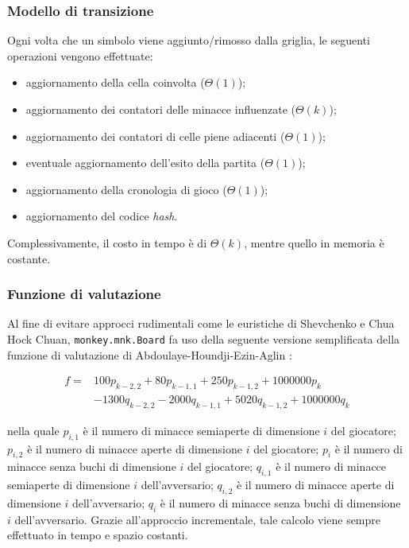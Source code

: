 \documentclass{article}
\begin{document}
\subsubsection{Modello di transizione}

Ogni volta che un simbolo viene aggiunto/rimosso dalla griglia, le seguenti
operazioni vengono effettuate:
\begin{itemize}
  \item aggiornamento della cella coinvolta ($\varTheta(1)$);
  \item aggiornamento dei contatori delle minacce influenzate ($\varTheta(k)$);
  \item aggiornamento dei contatori di celle piene adiacenti ($\varTheta(1)$);
  \item eventuale aggiornamento dell'esito della partita ($\varTheta(1)$);
  \item aggiornamento della cronologia di gioco ($\varTheta(1)$);
  \item aggiornamento del codice \emph{hash}.
\end{itemize}

Complessivamente, il costo in tempo è di $\varTheta(k)$, mentre quello in
memoria è costante.

\subsubsection{Funzione di valutazione}

Al fine di evitare approcci rudimentali come le euristiche di Shevchenko e Chua
Hock Chuan, \verb!monkey.mnk.Board! fa uso della seguente versione semplificata
della funzione di valutazione di Abdoulaye-Houndji-Ezin-Aglin \cite{abdoulaye}:

\begin{equation}
\begin{split}
  f ={} &100 p_{k - 2, 2} + 80 p_{k - 1, 1} + 250 p_{k - 1, 2} + 1000000 p_k \\
  & - 1300 q_{k - 2, 2} - 2000 q_{k - 1, 1} + 5020 q_{k - 1, 2} + 1000000 q_k
\end{split}
\end{equation}

nella quale $p_{i, 1}$ è il numero di minacce semiaperte di dimensione $i$ del
giocatore; $p_{i, 2}$ è il numero di minacce aperte di dimensione $i$ del
giocatore; $p_i$ è il numero di minacce senza buchi di dimensione $i$ del
giocatore; $q_{i, 1}$ è il numero di minacce semiaperte di dimensione $i$
dell'avversario; $q_{i, 2}$ è il numero di minacce aperte di dimensione $i$
dell'avversario; $q_i$ è il numero di minacce senza buchi di dimensione $i$
dell'avversario. Grazie all'approccio incrementale, tale calcolo viene sempre
effettuato in tempo e spazio costanti.
\end{document}
